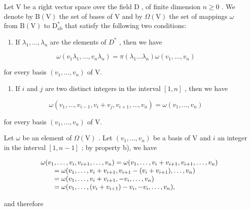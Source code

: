 Let \(\mathrm{V}\) be a right vector space over the field \(\mathrm{D}\) , of finite dimension \(n \geqslant 0\) . We denote by \(\mathrm{B(V)}\) the set of bases of \(\mathrm{V}\) and by \(\Omega(\mathrm{V})\) the set of mappings \(\omega\) from \(\mathrm{B(V)}\) to \(\mathrm{D}_{\mathrm{ab}}^{*}\) that satisfy the following two conditions:

\begin{enumerate}
\def\labelenumi{\alph{enumi})}
\tightlist
\item
  If \(\lambda_1, \ldots, \lambda_n\) are the elements of \(D^*\) , then we have
\end{enumerate}

\[
\omega (v _ {1} \lambda_ {1}, \ldots , v _ {n} \lambda_ {n}) = \pi (\lambda_ {1} \dots \lambda_ {n}) \omega (v _ {1}, \ldots , v _ {n})\tag{1}
\]

for every basis \((v_{1},\ldots ,v_{n})\) of V.

\begin{enumerate}
\def\labelenumi{\alph{enumi})}
\setcounter{enumi}{1}
\tightlist
\item
  If \(i\) and \(j\) are two distinct integers in the interval \([1, n]\) , then we have
\end{enumerate}

\[
\omega (v _ {1}, \ldots , v _ {i - 1}, v _ {i} + v _ {j}, v _ {i + 1}, \ldots , v _ {n}) = \omega (v _ {1}, \ldots , v _ {n})\tag{2}
\]

for every basis \((v_{1},\ldots ,v_{n})\) of V.

Let \(\omega\) be an element of \(\Omega(\mathrm{V})\) . Let \((v_1, \ldots, v_n)\) be a basis of \(\mathrm{V}\) and \(i\) an integer in the interval \([1, n-1]\) ; by property b), we have

\[
\begin{array}{r l} & {\omega (v _ {1}, \ldots , v _ {i}, v _ {i + 1}, \ldots , v _ {n}) = \omega (v _ {1}, \ldots , v _ {i} + v _ {i + 1}, v _ {i + 1}, \ldots , v _ {n})} \\ & {\qquad = \omega (v _ {1}, \ldots , v _ {i} + v _ {i + 1}, v _ {i + 1} - (v _ {i} + v _ {i + 1}), \ldots , v _ {n})} \\ & {\qquad = \omega (v _ {1}, \ldots , v _ {i} + v _ {i + 1}, - v _ {i}, \ldots , v _ {n})} \\ & {\qquad = \omega (v _ {1}, \ldots , (v _ {i} + v _ {i + 1}) - v _ {i}, - v _ {i}, \ldots , v _ {n}),} \end{array}
\]

and therefore

